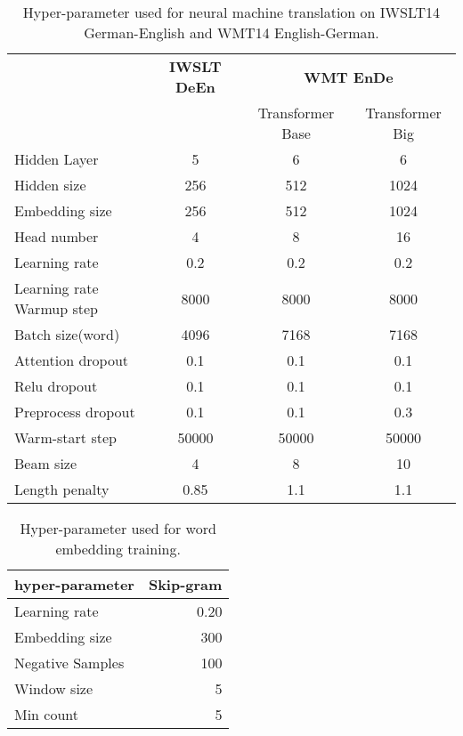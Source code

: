 \documentclass{article}
\begin{document}
\begin{table}[!htbp]
\begin{center}
		\begin{tabular}{l|c||cc}
			\toprule
			& \bf IWSLT DeEn & \multicolumn{2}{c}{\bf WMT EnDe}\\
            & & \small Transformer Base & \small Transformer Big\\
            \hline
			Hidden Layer & 5 & 6 & 6\\
            Hidden size & 256 & 512 & 1024\\
            Embedding size & 256 & 512 & 1024\\
            Head number & 4 & 8 & 16\\
            Learning rate & 0.2 & 0.2 & 0.2\\
            Learning rate Warmup step & 8000 & 8000 & 8000\\
            Batch size(word) & 4096 & 7168 & 7168\\
            \hline
            Attention dropout & 0.1 & 0.1 & 0.1\\
            Relu dropout & 0.1 & 0.1 & 0.1\\
            Preprocess dropout & 0.1 & 0.1 & 0.3\\
            \hline
            Warm-start step & 50000 & 50000 & 50000 \\
            \hline
            Beam size &4 & 8& 10\\
            \hline
            Length penalty & 0.85 & 1.1& 1.1\\
            \bottomrule
		\end{tabular}
	\end{center}
	\caption{\label{mt-hyper-table} Hyper-parameter used for neural machine translation on IWSLT14 German-English and WMT14 English-German.}
\end{table}

\begin{table}[!htbp]
\begin{center}
		\begin{tabular}{l|r}
			\toprule
			\bf hyper-parameter & \bf Skip-gram \\
            \hline
            Learning rate & 0.20 \\
            Embedding size & 300 \\
            Negative Samples & 100 \\
            Window size & 5 \\
            Min count & 5 \\
            \bottomrule
		\end{tabular}
	\end{center}
	\caption{\label{embedding-hyper-table} Hyper-parameter used for word embedding training. }
\end{table}
\end{document}
